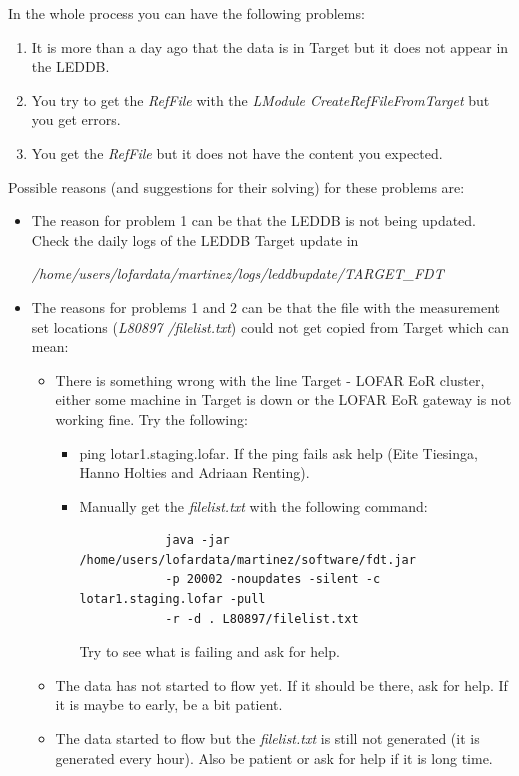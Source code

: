 \documentclass[a4paper,11pt]{article}
\begin{document}
In the whole process you can have the following problems:

\begin{enumerate}
	\item It is more than a day ago that the data is in Target but it does not appear in the LEDDB.
	\item You try to get the \textit{RefFile} with the \textit{LModule CreateRefFileFromTarget} but you get errors. 
	\item You get the \textit{RefFile} but it does not have the content you expected.
\end{enumerate}	

Possible reasons (and suggestions for their solving) for these problems are:

\begin{itemize}
	\item The reason for problem 1 can be that the LEDDB is not being updated. Check the daily logs of the LEDDB Target update in 
	
\textit{/home/users/lofardata/martinez/logs/leddbupdate/TARGET\_FDT}

	\item The reasons for problems 1 and 2 can be that the file with the measurement set locations (\textit{L80897 /filelist.txt}) could not get copied from Target which can mean:
	\begin{itemize}
		\item There is something wrong with the line Target - LOFAR EoR cluster, either some machine in Target is down or the LOFAR EoR gateway is not working fine. Try the following:
		
		\begin{itemize}
			\item ping lotar1.staging.lofar. If the ping fails ask help (Eite Tiesinga, Hanno Holties and Adriaan Renting).
			\item Manually get the \textit{filelist.txt} with the following command:
			\begin{verbatim}
	 		java -jar /home/users/lofardata/martinez/software/fdt.jar 
		 	-p 20002 -noupdates -silent -c lotar1.staging.lofar -pull 
		 	-r -d . L80897/filelist.txt
			\end{verbatim}
			Try to see what is failing and ask for help.
		\end{itemize}
		\item The data has not started to flow yet. If it should be there, ask for help. If it is maybe to early, be a bit patient.
		\item The data started to flow but the \textit{filelist.txt} is still not generated (it is generated every hour). Also be patient or ask for help if it is long time.
	\end{itemize}
	

\end{itemize}
\end{document}
